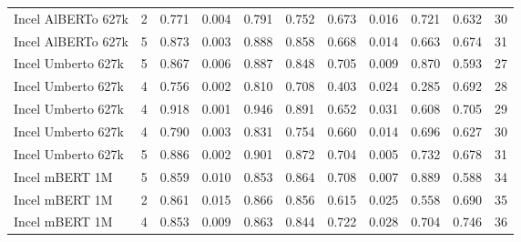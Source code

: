 \begin{tabular}{lrrrrrrrrrr}
Incel AlBERTo 627k &      2 &  0.771 &                 0.004 &          0.791 &                  0.752 &                   0.673 &                 0.016 &           0.721 &                  0.632 &                      30 \\
Incel AlBERTo 627k &      5 &  0.873 &                 0.003 &          0.888 &                  0.858 &                   0.668 &                 0.014 &           0.663 &                  0.674 &                      31 \\
Incel Umberto 627k &      5 &  0.867 &                 0.006 &          0.887 &                  0.848 &                   0.705 &                 0.009 &           0.870 &                  0.593 &                      27 \\
Incel Umberto 627k &      4 &  0.756 &                 0.002 &          0.810 &                  0.708 &                   0.403 &                 0.024 &           0.285 &                  0.692 &                      28 \\
Incel Umberto 627k &      4 &  0.918 &                 0.001 &          0.946 &                  0.891 &                   0.652 &                 0.031 &           0.608 &                  0.705 &                      29 \\
Incel Umberto 627k &      4 &  0.790 &                 0.003 &          0.831 &                  0.754 &                   0.660 &                 0.014 &           0.696 &                  0.627 &                      30 \\
Incel Umberto 627k &      5 &  0.886 &                 0.002 &          0.901 &                  0.872 &                   0.704 &                 0.005 &           0.732 &                  0.678 &                      31 \\
    Incel mBERT 1M &      5 &  0.859 &                 0.010 &          0.853 &                  0.864 &                   0.708 &                 0.007 &           0.889 &                  0.588 &                      34 \\
    Incel mBERT 1M &      2 &  0.861 &                 0.015 &          0.866 &                  0.856 &                   0.615 &                 0.025 &           0.558 &                  0.690 &                      35 \\
    Incel mBERT 1M &      4 &  0.853 &                 0.009 &          0.863 &                  0.844 &                   0.722 &                 0.028 &           0.704 &                  0.746 &                      36 \\

\end{tabular}
